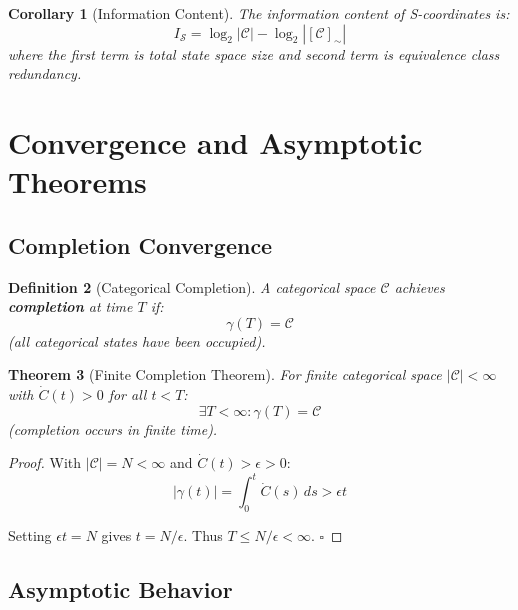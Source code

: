 \documentclass[12pt,a4paper]{article}
\newtheorem{theorem}{Theorem}[section]
\newtheorem{corollary}[theorem]{Corollary}
\newtheorem{definition}[theorem]{Definition}
\begin{document}
\begin{corollary}[Information Content]
\label{cor:information_content}
The information content of S-coordinates is:
\begin{equation}
I_{\mathcal{S}} = \log_2 |\mathcal{C}| - \log_2 |[\mathcal{C}]_{\sim}|
\end{equation}
where the first term is total state space size and second term is equivalence class redundancy.
\end{corollary}

\section{Convergence and Asymptotic Theorems}

\subsection{Completion Convergence}

\begin{definition}[Categorical Completion]
\label{def:categorical_completion}
A categorical space $\mathcal{C}$ achieves \textbf{completion} at time $T$ if:
\begin{equation}
\gamma(T) = \mathcal{C}
\end{equation}
(all categorical states have been occupied).
\end{definition}

\begin{theorem}[Finite Completion Theorem]
\label{thm:finite_completion}
For finite categorical space $|\mathcal{C}| < \infty$ with $\dot{C}(t) > 0$ for all $t < T$:
\begin{equation}
\exists T < \infty: \gamma(T) = \mathcal{C}
\end{equation}
(completion occurs in finite time).
\end{theorem}

\begin{proof}
With $|\mathcal{C}| = N < \infty$ and $\dot{C}(t) > \epsilon > 0$:
\begin{equation}
|\gamma(t)| = \int_0^t \dot{C}(s) \, ds > \epsilon t
\end{equation}

Setting $\epsilon t = N$ gives $t = N/\epsilon$. Thus $T \leq N/\epsilon < \infty$. $\square$
\end{proof}

\subsection{Asymptotic Behavior}
\end{document}
